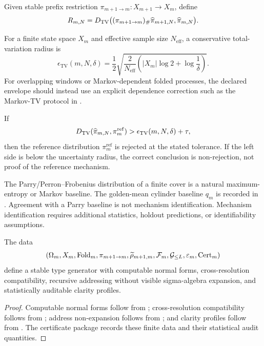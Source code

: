 \begin{definition}
\label{def:cross-resolution-residual}
Given stable prefix restriction \(\pi_{m+1\to m}:X_{m+1}\to X_m\), define
\[
R_{m,N}=
D_{\mathrm{TV}}\bigl((\pi_{m+1\to m})_\#\widehat\pi_{m+1,N},\widehat\pi_{m,N}\bigr).
\]
\end{definition}

\begin{definition}
\label{def:tv-envelope}
For a finite state space \(X_m\) and effective sample size \(N_{\mathrm{eff}}\), a conservative total-variation radius is
\[
\epsilon_{\mathrm{TV}}(m,N,\delta)=
\frac12\sqrt{\frac{2}{N_{\mathrm{eff}}}\left(|X_m|\log2+\log\frac1\delta\right)}.
\]
For overlapping windows or Markov-dependent folded processes, the declared envelope should instead use an explicit dependence correction such as the Markov-TV protocol in .
\end{definition}

\begin{proposition}
\label{prop:finite-sample-audit-semantics}
If
\[
D_{\mathrm{TV}}(\widehat\pi_{m,N},\pi_m^{\mathrm{ref}})
>
\epsilon_{\mathrm{TV}}(m,N,\delta)+\tau,
\]
then the reference distribution \(\pi_m^{\mathrm{ref}}\) is rejected at the stated tolerance.  If the left side is below the uncertainty radius, the correct conclusion is non-rejection, not proof of the reference mechanism.
\end{proposition}

\begin{remark}
The Parry/Perron--Frobenius distribution of a finite cover is a natural maximum-entropy or Markov baseline.  The golden-mean cylinder baseline \(q_m\) is recorded in .  Agreement with a Parry baseline is not mechanism identification.  Mechanism identification requires additional statistics, holdout predictions, or identifiability assumptions.
\end{remark}

\begin{corollary}
\label{thm:auditable-stable-type-generator}
The data
\[
(\Omega_m,X_m,\operatorname{Fold}_m,\pi_{m+1\to m},\widetilde\rho_{m+1,m},\mathcal F_m,\mathcal G_{\le L},\varepsilon_m,\operatorname{Cert}_m)
\]
define a stable type generator with computable normal forms, cross-resolution compatibility, recursive addressing without visible sigma-algebra expansion, and statistically auditable clarity profiles.
\end{corollary}

\begin{proof}
Computable normal forms follow from ; cross-resolution compatibility follows from ; address non-expansion follows from ; and clarity profiles follow from .  The certificate package records these finite data and their statistical audit quantities.
\end{proof}
